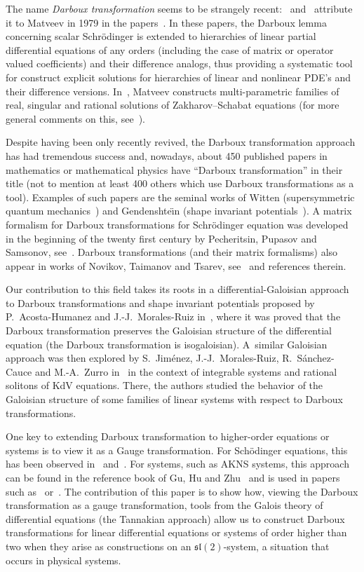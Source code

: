 \documentclass[10pt,a4paper]{amsart}
\numberwithin{equation}{section}
\begin{document}
The name \emph{Darboux transformation} seems to be strangely recent:~\cite{rosu1999short} and~\cite{GHZ} attribute it to Matveev in 1979 in the papers~\cite{Ma79u,Ma79m,MaSa79a}.
In these papers, the Darboux lemma concerning scalar Schr\"odinger
is extended to hierarchies
of linear partial differential equations of any orders (including the case of matrix or operator valued coefficients)
and their difference analogs, thus providing a systematic tool for construct explicit solutions
for hierarchies of linear and nonlinear PDE's and their difference versions.
In~\cite{Ma79a}, Matveev constructs multi-parametric families of real, singular and rational solutions of Zakharov--Schabat equations (for more general comments on this, see~\cite{Ma00a}).


Despite having been only recently revived, the Darboux transformation approach has had tremendous success and, nowadays, about 450 published papers in mathematics or mathematical physics have ``Darboux transformation'' in their title (not to mention at least 400 others which use Darboux transformations as a tool). Examples of such papers are the seminal works of Witten (supersymmetric quantum mechanics~\cite{wi}) and Gendenshte\"{\i}n (shape invariant potentials~\cite{ge}).
A matrix formalism for Darboux transformations for Schr\"odinger
equation was developed in the beginning of the twenty first century by Pecheritsin, Pupasov and Samsonov, see~\cite{sape}. Darboux transformations (and their matrix formalisms) also appear
in works of Novikov, Taimanov and Tsarev, see~\cite{NoTa16b,NoTa18v} and references therein.

Our contribution to this field takes its roots in a differential-Galoisian approach to Darboux transformations and shape
invariant potentials proposed by P.~Acosta-Humanez and \mbox{J.-J.~Morales}-Ruiz in~\cite{AP2,ac2,AP1}, where it was proved that the Darboux transformation
preserves the Galoisian structure of the differential equation (the Darboux transformation is isogaloisian). A~similar Galoisian approach was then explored by S.~Jim\'enez, \mbox{J.-J.~Morales}-Ruiz, R.~S\'anchez-Cauce and M.-A.~Zurro in~\cite{JiMoSaZu17r,JiMoSaZu18v,JiMoSaZu19f} in the context of integrable systems and rational solitons of KdV equations.
There, the authors studied the behavior of the Galoisian structure of some families of linear systems with respect to Darboux transformations.

One key to extending Darboux transformation to higher-order equations or systems is to view it as a Gauge transformation. For Sch\"odinger equations, this has been observed in~\cite{AP1} and~\cite{AP2,ac2}. For systems, such as AKNS systems, this approach can be found in the reference book of Gu, Hu and Zhu~\cite[Section~1.3, p.~18]{GHZ} and is used in papers such as~\cite{YaRu13m} or~\cite{JiMoSaZu17r,JiMoSaZu18v,JiMoSaZu19f}.
The contribution of this paper is to show how, viewing the Darboux transformation as a gauge transformation, tools from the Galois theory of differential equations (the Tannakian approach) allow us to construct Darboux transformations for linear differential equations or systems of order higher than two when they arise as constructions on an $\mathfrak{sl}(2)$-system, a situation that occurs in physical systems.
\end{document}
